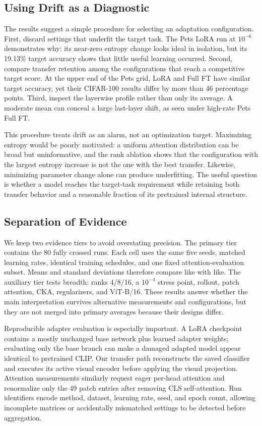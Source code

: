\documentclass[conference]{IEEEtran}
\begin{document}
\subsection{Using Drift as a Diagnostic}
The results suggest a simple procedure for selecting an adaptation configuration. First, discard settings that underfit the target task. The Pets LoRA run at $10^{-6}$ demonstrates why: its near-zero entropy change looks ideal in isolation, but its 19.13\% target accuracy shows that little useful learning occurred. Second, compare transfer retention among the configurations that reach a competitive target score. At the upper end of the Pets grid, LoRA and Full FT have similar target accuracy, yet their CIFAR-100 results differ by more than 46 percentage points. Third, inspect the layerwise profile rather than only its average. A moderate mean can conceal a large last-layer shift, as seen under high-rate Pets Full FT.

This procedure treats drift as an alarm, not an optimization target. Maximizing entropy would be poorly motivated: a uniform attention distribution can be broad but uninformative, and the rank ablation shows that the configuration with the largest entropy increase is not the one with the best transfer. Likewise, minimizing parameter change alone can produce underfitting. The useful question is whether a model reaches the target-task requirement while retaining both transfer behavior and a reasonable fraction of its pretrained internal structure.

\subsection{Separation of Evidence}
We keep two evidence tiers to avoid overstating precision. The primary tier contains the 80 fully crossed runs. Each cell uses the same five seeds, matched learning rates, identical training schedules, and one fixed attention-evaluation subset. Means and standard deviations therefore compare like with like. The auxiliary tier tests breadth: ranks 4/8/16, a $10^{-4}$ stress point, rollout, patch attention, CKA, regularizers, and ViT-B/16. These results answer whether the main interpretation survives alternative measurements and configurations, but they are not merged into primary averages because their designs differ.

Reproducible adapter evaluation is especially important. A LoRA checkpoint contains a mostly unchanged base network plus learned adapter weights; evaluating only the base branch can make a damaged adapted model appear identical to pretrained CLIP. Our transfer path reconstructs the saved classifier and executes its active visual encoder before applying the visual projection. Attention measurements similarly request eager per-head attention and renormalize only the 49 patch entries after removing CLS self-attention. Run identifiers encode method, dataset, learning rate, seed, and epoch count, allowing incomplete matrices or accidentally mismatched settings to be detected before aggregation.
\end{document}
